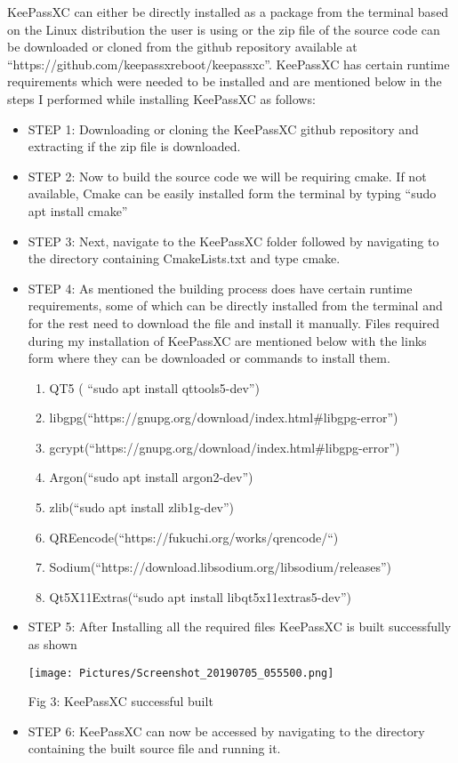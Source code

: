 \documentclass[12pt]{article}
\begin{document}
KeePassXC can either be directly installed as a package from the terminal based on the Linux distribution the user is using or the zip file of the source code can be downloaded or cloned from the github repository available at “https://github.com/keepassxreboot/keepassxc”. KeePassXC has certain runtime requirements which were needed to be installed and are mentioned below in the steps I performed while installing KeePassXC as follows:

\begin{itemize}
  \item STEP 1: Downloading or cloning the KeePassXC github repository and extracting if the zip file is  downloaded.
  \item STEP 2: Now to build the source code we will be requiring cmake. If not available, Cmake can be easily installed form the terminal by typing “sudo apt install cmake”
  \item STEP 3: Next, navigate to the KeePassXC folder followed by navigating to the directory containing CmakeLists.txt and type cmake.
  \item STEP 4: As mentioned the building process does have certain runtime requirements, some of which can be directly installed from the terminal and for the rest need to download the file and install it manually. Files required during my installation of KeePassXC are mentioned below with the links form where they can be downloaded or commands to install them.
  \begin{enumerate}
  
  
     \item QT5 ( “sudo apt install qttools5-dev”)
     \item libgpg(“https://gnupg.org/download/index.html#libgpg-error”)
     \item gcrypt(“https://gnupg.org/download/index.html#libgpg-error”)
     \item Argon(“sudo apt install argon2-dev”)
     \item zlib(“sudo apt install zlib1g-dev”)
     \item QREencode(“https://fukuchi.org/works/qrencode/“)
     \item Sodium(“https://download.libsodium.org/libsodium/releases”)
     \item Qt5X11Extras(“sudo apt install libqt5x11extras5-dev”)
	\end{enumerate}

\item STEP 5: After  Installing all the required files KeePassXC is built successfully as shown


\texttt{[image: Pictures/Screenshot\_20190705\_055500.png]}
\caption{Fig 3: KeePassXC successful built}

\item STEP 6: KeePassXC can now be accessed by navigating to the directory containing the built source file and running it.
\end{itemize}
\end{document}
